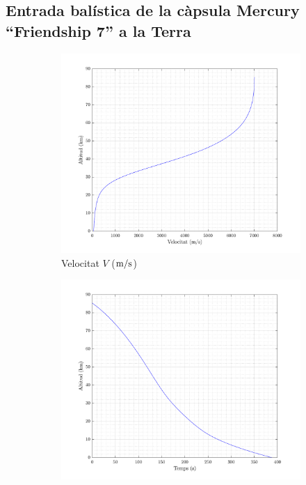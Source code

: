 \clearpage
\subsection{Entrada balística de la càpsula Mercury ``Friendship 7'' a la Terra}

\begin{figure}[ht]
    \centering
    \begin{subfigure}{.37\textwidth}
        \centering
        \includegraphics[width=\linewidth]{imagenes/09_mercury_graficas/velocitat_no_title.pdf}
        \caption{Velocitat $V$ ($\meter/\second$)}
    \end{subfigure}%
    \begin{subfigure}{.37\textwidth}
        \centering
        \includegraphics[width=\linewidth]{imagenes/09_mercury_graficas/temps_no_title.pdf}

\end{subfigure}
\end{figure}
